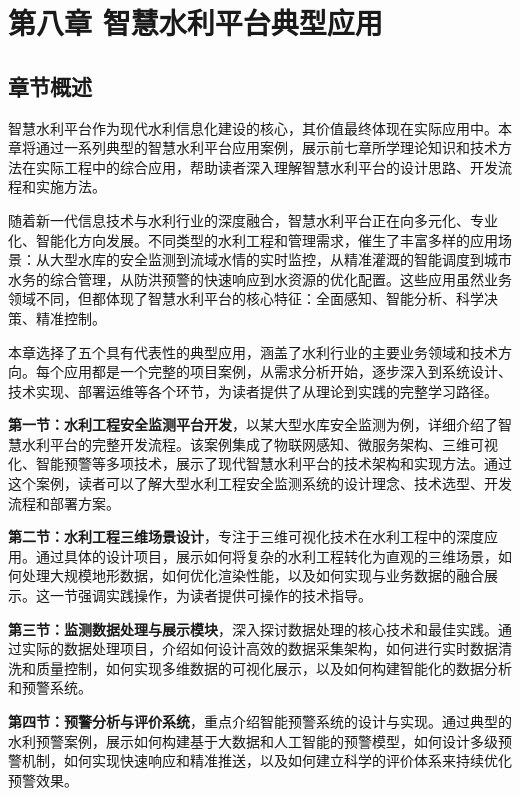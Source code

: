 \section{第八章
智慧水利平台典型应用}\label{ux7b2cux516bux7ae0-ux667aux6167ux6c34ux5229ux5e73ux53f0ux5178ux578bux5e94ux7528}

\subsection{章节概述}\label{ux7ae0ux8282ux6982ux8ff0}

智慧水利平台作为现代水利信息化建设的核心，其价值最终体现在实际应用中。本章将通过一系列典型的智慧水利平台应用案例，展示前七章所学理论知识和技术方法在实际工程中的综合应用，帮助读者深入理解智慧水利平台的设计思路、开发流程和实施方法。

随着新一代信息技术与水利行业的深度融合，智慧水利平台正在向多元化、专业化、智能化方向发展。不同类型的水利工程和管理需求，催生了丰富多样的应用场景：从大型水库的安全监测到流域水情的实时监控，从精准灌溉的智能调度到城市水务的综合管理，从防洪预警的快速响应到水资源的优化配置。这些应用虽然业务领域不同，但都体现了智慧水利平台的核心特征：全面感知、智能分析、科学决策、精准控制。

本章选择了五个具有代表性的典型应用，涵盖了水利行业的主要业务领域和技术方向。每个应用都是一个完整的项目案例，从需求分析开始，逐步深入到系统设计、技术实现、部署运维等各个环节，为读者提供了从理论到实践的完整学习路径。

\textbf{第一节：水利工程安全监测平台开发}，以某大型水库安全监测为例，详细介绍了智慧水利平台的完整开发流程。该案例集成了物联网感知、微服务架构、三维可视化、智能预警等多项技术，展示了现代智慧水利平台的技术架构和实现方法。通过这个案例，读者可以了解大型水利工程安全监测系统的设计理念、技术选型、开发流程和部署方案。

\textbf{第二节：水利工程三维场景设计}，专注于三维可视化技术在水利工程中的深度应用。通过具体的设计项目，展示如何将复杂的水利工程转化为直观的三维场景，如何处理大规模地形数据，如何优化渲染性能，以及如何实现与业务数据的融合展示。这一节强调实践操作，为读者提供可操作的技术指导。

\textbf{第三节：监测数据处理与展示模块}，深入探讨数据处理的核心技术和最佳实践。通过实际的数据处理项目，介绍如何设计高效的数据采集架构，如何进行实时数据清洗和质量控制，如何实现多维数据的可视化展示，以及如何构建智能化的数据分析和预警系统。

\textbf{第四节：预警分析与评价系统}，重点介绍智能预警系统的设计与实现。通过典型的水利预警案例，展示如何构建基于大数据和人工智能的预警模型，如何设计多级预警机制，如何实现快速响应和精准推送，以及如何建立科学的评价体系来持续优化预警效果。

